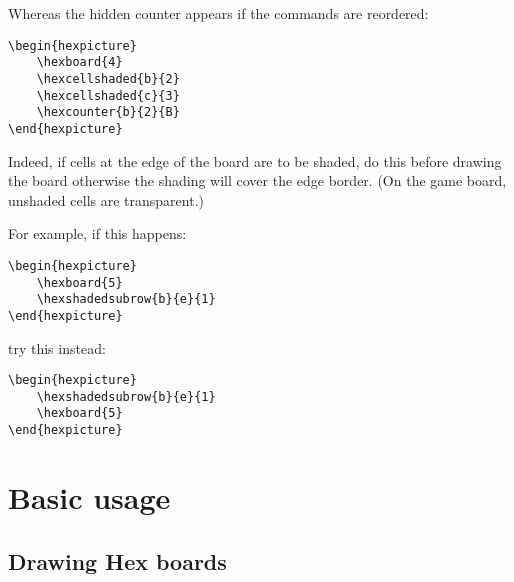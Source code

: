 \documentclass[a4paper,12pt]{article}
\begin{document}
    Whereas the hidden counter appears if the commands are reordered:

\begin{verbatim}\begin{hexpicture}
    \hexboard{4}
    \hexcellshaded{b}{2}
    \hexcellshaded{c}{3}
    \hexcounter{b}{2}{B}
\end{hexpicture}\end{verbatim}

    \begin{hexpicture}
    \end{hexpicture}

    Indeed, if cells at the edge of the board are to be shaded, do this before drawing the board otherwise the shading will cover the edge border. (On the game board, unshaded cells are transparent.)
    
    For example, if this happens:
    
    \begin{verbatim}\begin{hexpicture}
    \hexboard{5}
    \hexshadedsubrow{b}{e}{1}
\end{hexpicture}\end{verbatim}
    
    \begin{hexpicture}
    \end{hexpicture}

    try this instead:
    
    \begin{verbatim}\begin{hexpicture}
    \hexshadedsubrow{b}{e}{1}
    \hexboard{5}
\end{hexpicture}\end{verbatim}
    
    \begin{hexpicture}
    \end{hexpicture}
    

    \section{Basic usage}

    \subsection{Drawing Hex boards}
    
\end{document}
